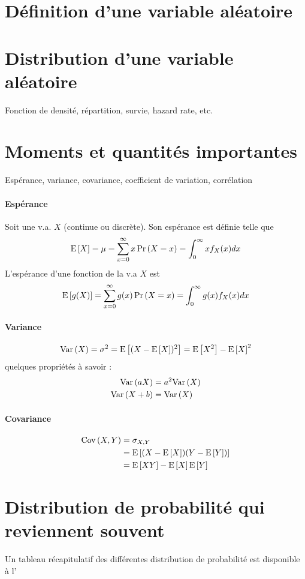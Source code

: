 \section{Définition d'une variable aléatoire}

\section{Distribution d'une variable aléatoire}
Fonction de densité, répartition, survie, hazard rate, etc.

\section{Moments et quantités importantes}
Espérance, variance, covariance, coefficient de variation, corrélation

\paragraph{Espérance} Soit une v.a. $X$ (continue ou discrète). Son espérance est définie telle que
\begin{equation}
\label{eq:esp-univarie}
\mathrm{E} \left[ X \right] = \mu = \sum_{x=0}^{\infty} x \Pr \left( X = x \right) = \int_{0}^{\infty} x f_X(x) dx
\end{equation}
L'espérance d'une fonction de la v.a $X$ est
\begin{equation}
\label{eq:esp-fct-univarie}
\mathrm{E} \left[ g(X) \right] = \sum_{x=0}^{\infty} g(x) \Pr \left( X = x \right) = \int_{0}^{\infty} g(x) f_X(x) dx
\end{equation}

\paragraph{Variance}
\begin{equation}
\label{eq:variance}
\mathrm{Var} \left( X \right) = \sigma^2 = \mathrm{E} \left[ (X - \mathrm{E} \left[ X \right])^2 \right] = \mathrm{E} \left[ X^2 \right] - \mathrm{E} \left[ X \right]^2
\end{equation}
quelques propriétés à savoir : 
\begin{align*}
\mathrm{Var} \left( aX \right) 		& = a^2 \mathrm{Var} \left( X \right) \\
\mathrm{Var} \left( X + b \right)	& = \mathrm{Var} \left( X \right)
\end{align*}

\paragraph{Covariance}
\begin{align}
\label{eq:covariance}
\mathrm{Cov} \left( X,Y \right) &=  \sigma_{X,Y} \\
            &= \mathrm{E} \left[ (X-\mathrm{E} \left[ X \right])(Y - \mathrm{E} \left[ Y \right]) \right] \\
            &= \mathrm{E} \left[ XY \right] - \mathrm{E} \left[ X \right] \mathrm{E} \left[ Y \right]
\end{align}



\section{Distribution de probabilité qui reviennent souvent}
Un tableau récapitulatif des différentes distribution de probabilité est disponible à l'
